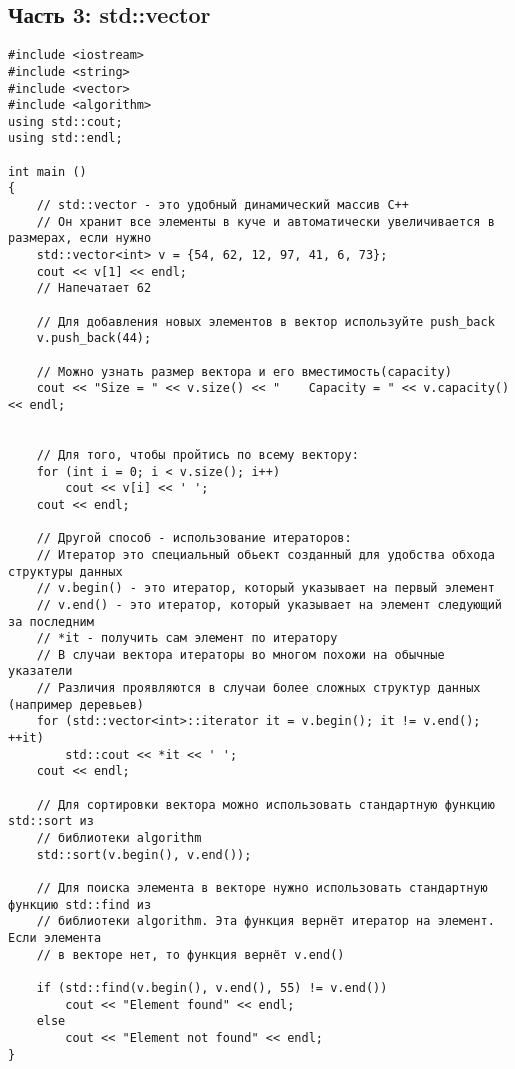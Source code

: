 \documentclass{article}
\begin{document}
\newpage
\subsection*{Часть 3: std::vector}
\begin{lstlisting}
#include <iostream>
#include <string>
#include <vector>
#include <algorithm>
using std::cout;
using std::endl;

int main () 
{
    // std::vector - это удобный динамический массив C++
    // Он хранит все элементы в куче и автоматически увеличивается в размерах, если нужно
    std::vector<int> v = {54, 62, 12, 97, 41, 6, 73};
    cout << v[1] << endl;
    // Напечатает 62
    
    // Для добавления новых элементов в вектор используйте push_back   
    v.push_back(44);
    
    // Можно узнать размер вектора и его вместимость(capacity)
    cout << "Size = " << v.size() << "    Capacity = " << v.capacity() << endl;
    
    
    // Для того, чтобы пройтись по всему вектору:
    for (int i = 0; i < v.size(); i++)
    	cout << v[i] << ' ';
    cout << endl;

    // Другой способ - использование итераторов:
    // Итератор это специальный обьект созданный для удобства обхода структуры данных
    // v.begin() - это итератор, который указывает на первый элемент
    // v.end() - это итератор, который указывает на элемент следующий за последним
    // *it - получить сам элемент по итератору
    // В случаи вектора итераторы во многом похожи на обычные указатели
    // Различия проявляются в случаи более сложных структур данных (например деревьев)
    for (std::vector<int>::iterator it = v.begin(); it != v.end(); ++it)
        std::cout << *it << ' ';
    cout << endl;
    
    // Для сортировки вектора можно использовать стандартную функцию std::sort из
    // библиотеки algorithm
    std::sort(v.begin(), v.end());
    
    // Для поиска элемента в векторе нужно использовать стандартную функцию std::find из
    // библиотеки algorithm. Эта функция вернёт итератор на элемент. Если элемента
    // в векторе нет, то функция вернёт v.end()
    
    if (std::find(v.begin(), v.end(), 55) != v.end())
    	cout << "Element found" << endl;
    else
    	cout << "Element not found" << endl;
}
\end{lstlisting}
\end{document}
